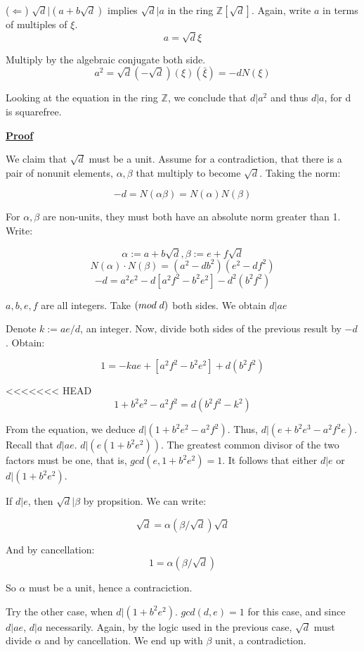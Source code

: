 \documentclass{article}
\def\_{{\hspace{1mm}}}
\def\contradiction{{\lightning}}
\newcommand{\Proof}{{
    \vspace{2mm}
    \noindent
    \textbf{
    \underline{Proof}}
}
}
\begin{document}
($\Leftarrow$) 
$\sqrt{d}|(a+b\sqrt{d})$ implies
$\sqrt{d}|a$ in the ring $\mathbb{Z}[\sqrt{d}]$. Again, write $a$ in terms 
of multiples of $\xi$. 
\[
    a = \sqrt{d}\xi
\]

Multiply by the algebraic conjugate both side.
\[
    a^2 = \sqrt{d}(-\sqrt{d})(\xi)(\bar{\xi}) = -dN(\xi)
\]

Looking at the equation in the ring $\mathbb{Z}$,
we conclude that $d|a^2$ and thus $d|a$, for d is squarefree. 

\Proof
We claim that $\sqrt{d}$ must be a unit. Assume for a contradiction,
that there is a pair of nonunit elements, $\alpha, \beta$ that 
multiply to become $\sqrt{d}$. Taking the norm:

\[
    -d = N(\alpha \beta) = N(\alpha) N(\beta)
\]

For $\alpha, \beta$ are non-units, they must both have an absolute 
norm greater than 1. Write:

\[
    \alpha := a + b\sqrt{d}, \beta := e+f\sqrt{d}
\]
\[
    N(\alpha)\cdot N(\beta) = (a^2-db^2)(e^2-df^2)
\]
\[
    -d = a^2e^2-d[a^2f^2-b^2e^2]-d^2(b^2f^2)
\]

$a, b, e, f$ are all integers. Take $(mod \_ d)$ both sides. We obtain $d|ae$

Denote $k:= ae/d$, an integer. Now, divide both sides of the previous 
result by $-d$. Obtain:

\[
    1 = -kae+[a^2f^2-b^2e^2]+d(b^2f^2)
\]

<<<<<<< HEAD
\[
    1+b^2e^2-a^2f^2 = d(b^2f^2-k^2)
\]

From the equation, we deduce $d|(1+b^2e^2-a^2f^2)$. Thus, 
$d|(e+b^2e^3-a^2f^2e)$. Recall that $d|ae$. 
$d|(e(1+b^2e^2))$. The greatest common divisor of the two 
factors must be one, that is, $gcd(e, 1+b^2e^2) = 1$. It follows 
that either $d|e$ or $d|(1+b^2e^2)$. 

If $d|e$, then $\sqrt{d}|\beta$ by propsition. We can write:

\[
    \sqrt{d} = \alpha (\beta/\sqrt{d})\sqrt{d}
\]

And by cancellation:
\[
    1 = \alpha (\beta/\sqrt{d})
\]

So $\alpha$ must be a unit, hence a contraciction. 

Try the other case, when $d|(1+b^2e^2)$. $gcd(d, e) = 1$ for this case, 
and since $d|ae$, $d|a$ necessarily. Again, by the logic used in the previous 
case, $\sqrt{d}$ must divide $\alpha$ and by cancellation. We end up with 
$\beta$ unit, a contradiction. \contradiction 
\end{document}
